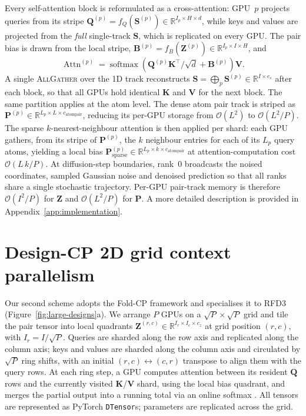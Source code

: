Every self-attention block is reformulated as a cross-attention: GPU~$p$ projects
queries from its stripe $\mathbf{Q}^{(p)}=f_Q(\mathbf{S}^{(p)})\in
\mathbb{R}^{I_p\times H\times d}$, while keys and values are projected from the
\emph{full} single-track $\mathbf{S}$, which is replicated on every GPU. The pair
bias is drawn from the local stripe, $\mathbf{B}^{(p)}=f_B(\mathbf{Z}^{(p)})\in
\mathbb{R}^{I_p\times I\times H}$, and
%
\begin{equation}
  \operatorname{Attn}^{(p)} = \operatorname{softmax}\!\left(
    \mathbf{Q}^{(p)} \mathbf{K}^\top/\sqrt{d} + \mathbf{B}^{(p)}
  \right) \mathbf{V}.
  \label{eq:cross-attn}
\end{equation}
%
A single \textsc{AllGather} over the 1D track reconstructs
$\mathbf{S}=\bigoplus_{p}\mathbf{S}^{(p)}\in\mathbb{R}^{I\times c_s}$ after each
block, so that all GPUs hold identical $\mathbf{K}$ and $\mathbf{V}$ for the next
block. The same partition applies at the atom level. The dense atom pair track is
striped as $\mathbf{P}^{(p)}\in\mathbb{R}^{L_p\times L\times c_\text{atompair}}$,
reducing its per-GPU storage from $\mathcal{O}(L^{2})$ to
$\mathcal{O}(L^{2}/P)$. The sparse $k$-nearest-neighbour attention is then applied
per shard: each GPU gathers, from its stripe of $\mathbf{P}^{(p)}$, the $k$
neighbour entries for each of its $L_p$ query atoms, yielding a local bias
$\mathbf{P}^{(p)}_\text{sparse}\in\mathbb{R}^{L_p\times k\times c_\text{atompair}}$
at attention-computation cost $\mathcal{O}(L\,k/P)$. At diffusion-step boundaries,
rank~$0$ broadcasts the noised coordinates, sampled Gaussian noise and denoised
prediction so that all ranks share a single stochastic trajectory. Per-GPU
pair-track memory is therefore $\mathcal{O}(I^{2}/P)$ for $\mathbf{Z}$ and
$\mathcal{O}(L^{2}/P)$ for $\mathbf{P}$. A more detailed description is provided in
Appendix~\ref{app:implementation}.

\section{Design-CP 2D grid context parallelism}
\label{sec:cp-2d}

Our second scheme adopts the Fold-CP framework \parencite{lin_fold-cp_2026} and
specialises it to RFD3 (Figure~\ref{fig:large-designs}a). We arrange $P$ GPUs on a
$\sqrt{P}\times\sqrt{P}$ grid and tile the pair tensor into local quadrants
$\mathbf{Z}^{(r,c)}\in\mathbb{R}^{I_r\times I_c\times c_z}$ at grid position
$(r,c)$, with $I_r=I/\sqrt{P}$. Queries are sharded along the row axis and
replicated along the column axis; keys and values are sharded along the column
axis and circulated by $\sqrt{P}$ ring shifts, with an initial
$(r,c)\leftrightarrow(c,r)$ transpose to align them with the query rows. At each
ring step, a GPU computes attention between its resident $\mathbf{Q}$ rows and the
currently visited $\mathbf{K}$/$\mathbf{V}$ shard, using the local bias quadrant,
and merges the partial output into a running total via an online softmax
\parencite{milakov_online_2018,liu_ring_2023}. All tensors are represented as
PyTorch \texttt{DTensor}s; parameters are replicated across the grid.

